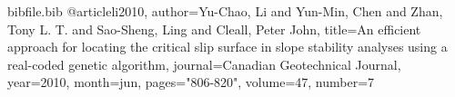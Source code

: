 \documentclass[12pt]{article}
\begin{document}
\begin{filecontents*}{bibfile.bib}
@article{li2010,
author={Yu-Chao, Li and Yun-Min, Chen and Zhan, Tony L. T. and Sao-Sheng, Ling and Cleall, Peter John},
title={An efficient approach for locating the critical slip surface in slope stability analyses using a real-coded genetic algorithm},
journal={Canadian Geotechnical Journal},
year={2010},
month=jun,
pages={"806-820"},
volume={47},
number={7}}
\end{filecontents*}
\nocite{*}
\printbibliography[heading=none]
\end{document}

